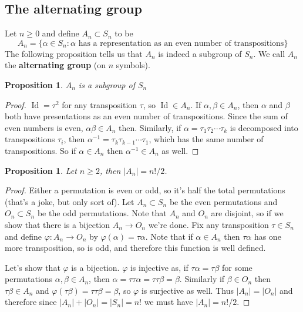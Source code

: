 \documentclass[12pt]{article}
\numberwithin{equation}{subsection}
\newtheorem{prop}[subsection]{Proposition}
\theoremstyle{note}
\newcommand{\Id}{\operatorname{Id}}
\begin{document}
\subsection{The alternating group}

Let $n\geq 0$ and define $A_n\subset S_n$ to be \begin{equation} A_n=\{ \alpha\in S_n : \text{$\alpha$ has a representation as an even number of transpositions}\}\end{equation}
The following proposition tells us that $A_n$ is indeed a subgroup of $S_n$. We call $A_n$ the \textbf{alternating group} (on $n$ symbols). 
\begin{prop} $A_n$ is a subgroup of $S_n$
\end{prop}
\begin{proof} $\Id=\tau^{2}$ for any transposition $\tau$, so $\Id\in A_n$. If $\alpha,\beta \in A_n$, then $\alpha$ and $\beta$ both have presentations as an even number of transpositions. Since the sum of even numbers is even, $\alpha\beta\in A_n$ then. Similarly, if $\alpha=\tau_1\tau_2\cdots\tau_k$ is decomposed into transpositions $\tau_i$, then $\alpha^{-1}=\tau_k\tau_{k-1}\cdots\tau_1$, which has the same number of transpositions. So if $\alpha\in A_n$ then $\alpha^{-1}\in A_n$ as well. 
\end{proof}

\begin{prop} \label{order-of-An}
	Let $n\geq 2$, then $|A_n|=n!/2$.
\end{prop}

\begin{proof}
Either a permutation is even or odd, so it's half the total permutations (that's a joke, but only sort of).  Let $A_n\subset S_n$ be the even permutations and $O_n\subset S_n$ be the odd permutations. Note that $A_n$ and $O_n$ are disjoint, so if we show that there is a bijection $A_n\to O_n$ we're done. Fix any transposition $\tau\in S_n$ and define $\varphi\colon A_n\to O_n$ by $\varphi(\alpha)=\tau\alpha$. Note that if $\alpha\in A_n$ then $\tau\alpha$ has one more transposition, so is odd, and therefore this function is well defined. 

Let's show that $\varphi$ is a bijection. $\varphi$ is injective as, if $\tau\alpha=\tau\beta$ for some permutations $\alpha,\beta\in A_n$, then $\alpha=\tau\tau\alpha=\tau\tau\beta=\beta$. Similarly if $\beta\in O_n$ then $\tau\beta\in A_n$ and $\varphi(\tau\beta)=\tau\tau\beta=\beta$, so $\varphi$ is surjective as well. Thus $|A_n|=|O_n|$ and therefore since $|A_n|+|O_n|=|S_n|=n!$ we must have $|A_n|=n!/2$.
\end{proof} 
\end{document}

